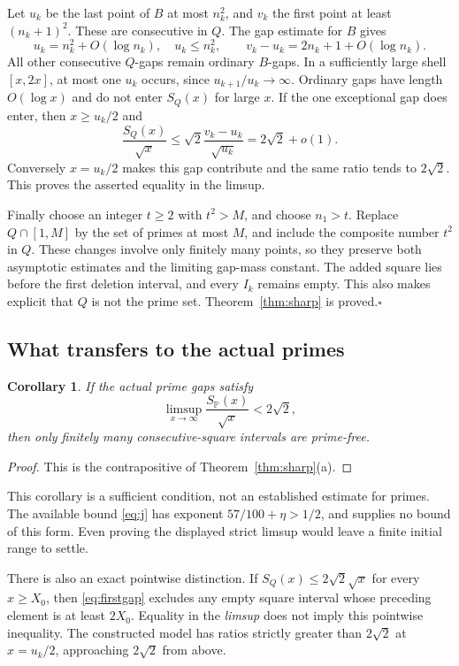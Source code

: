 \documentclass[11pt,a4paper]{article}
\newtheorem{corollary}[theorem]{Corollary}
\theoremstyle{definition}
\theoremstyle{remark}\newtheorem{remark}[theorem]{Remark}
\begin{document}
Let $u_k$ be the last point of $B$ at most $n_k^2$, and $v_k$ the first
point at least $(n_k+1)^2$. These are consecutive in $Q$. The gap
estimate for $B$ gives
\begin{equation}\label{eq:mergedgaps}
 u_k=n_k^2+O(\log n_k),\quad u_k\le n_k^2,\qquad
 v_k-u_k=2n_k+1+O(\log n_k).
\end{equation}
All other consecutive $Q$-gaps remain ordinary $B$-gaps. In a
sufficiently large shell $[x,2x]$, at most one $u_k$ occurs, since
$u_{k+1}/u_k\to\infty$. Ordinary gaps have length $O(\log x)$
and do not enter $S_Q(x)$ for large $x$. If the one exceptional gap
does enter, then $x\ge u_k/2$ and
\[
 \frac{S_Q(x)}{\sqrt x}
 \le\sqrt2\frac{v_k-u_k}{\sqrt{u_k}}=2\sqrt2+o(1).
\]
Conversely $x=u_k/2$ makes this gap contribute and the same ratio
tends to $2\sqrt2$. This proves the asserted equality in the limsup.

Finally choose an integer $t\ge2$ with $t^2>M$, and choose $n_1>t$.
Replace $Q\cap[1,M]$ by the set of primes at most $M$, and include
the composite number $t^2$ in $Q$. These changes involve only
finitely many points, so they preserve both asymptotic estimates
and the limiting gap-mass constant. The added square lies before
the first deletion interval, and every $I_k$ remains empty.
This also makes explicit that $Q$ is not the prime set.
Theorem~\ref{thm:sharp} is proved.\hfill$\square$

\subsection{What transfers to the actual primes}

\begin{corollary}\label{cor:strictthreshold}
If the actual prime gaps satisfy
\[
 \limsup_{x\to\infty}\frac{S_{\mathbb P}(x)}{\sqrt x}<2\sqrt2,
\]
then only finitely many consecutive-square intervals are prime-free.
\end{corollary}
\begin{proof}
This is the contrapositive of Theorem~\ref{thm:sharp}(a).
\end{proof}

This corollary is a sufficient condition, not an established estimate
for primes. The available bound \eqref{eq:j} has exponent
$57/100+\eta>1/2$, and supplies no bound of this form.
Even proving the displayed strict limsup would leave a finite
initial range to settle.

There is also an exact pointwise distinction. If
$S_Q(x)\le2\sqrt2\sqrt x$ for every $x\ge X_0$, then
\eqref{eq:firstgap} excludes any empty square interval whose
preceding element is at least $2X_0$. Equality in the \emph{limsup}
does not imply this pointwise inequality. The constructed model has
ratios strictly greater than $2\sqrt2$ at $x=u_k/2$, approaching
$2\sqrt2$ from above.
\end{document}

